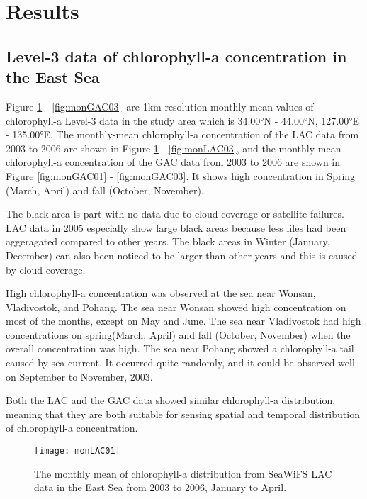 \section{Results}

\subsection{Level-3 data of chlorophyll-a concentration in the East Sea}

Figure \ref{fig:monLAC01} - \ref{fig:monGAC03}\ are 1km-resolution monthly mean values of chlorophyll-a Level-3 data in the study area which is 34.00°N - 44.00°N, 127.00°E - 135.00°E. The monthly-mean chlorophyll-a concentration of the LAC data from 2003 to 2006 are shown in Figure \ref{fig:monLAC01} - \ref{fig:monLAC03}, and the monthly-mean chlorophyll-a concentration of the GAC data from 2003 to 2006 are shown in Figure \ref{fig:monGAC01} - \ref{fig:monGAC03}. It shows high concentration in Spring (March, April) and fall (October, November).

The black area is part with no data due to cloud coverage or satellite failures. LAC data in 2005 especially show large black areas because less files had been aggeragated compared to other years. The black areas in Winter (January, December) can also been noticed to be larger than other years and this is caused by cloud coverage.

High chlorophyll-a concentration was observed at the sea near Wonsan, Vladivostok, and Pohang. The sea near Wonsan showed high concentration on most of the months, except on May and June. The sea near Vladivostok had high concentrations on spring(March, April) and fall (October, November) when the overall concentration was high. The sea near Pohang showed a chlorophyll-a tail caused by sea current. It occurred quite randomly, and it could be observed well on September to November, 2003. 

Both the LAC and the GAC data showed similar chlorophyll-a distribution, meaning that they are both suitable for sensing spatial and temporal distribution of chlorophyll-a concentration.

\begin{figure}[h]
	\centering
	\texttt{[image: monLAC01]}\\
	\caption{The monthly mean of chlorophyll-a distribution from SeaWiFS LAC data in the East Sea from 2003 to 2006, January to April.}
	\label{fig:monLAC01}
\end{figure}


